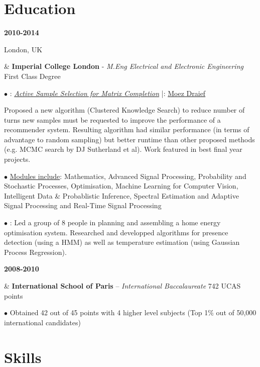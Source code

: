 \documentclass[a4paper,10pt,oneside]{article}
\begin{document}
\section*{Education}
\begin{body}

{\textbf{2010-2014} \par London, UK} & \textbf{Imperial College London} - \textit{M.Eng Electrical and Electronic Engineering} \hfill First Class Degree 



$\bullet$ \underline{}: \href{http://sg3510.github.io/al_proj/Report/thesis.pdf}{\textit{Active Sample Selection for Matrix Completion}} \hfill|\hfill  \underline{}: \href{http://www.iis.ee.ic.ac.uk/m.draief}{Moez Draief}

Proposed a new algorithm (Clustered Knowledge Search) to reduce number of turns new samples must be requested to improve the performance of a recommender system. Resulting algorithm had similar performance (in terms of advantage to random sampling) but better runtime than other proposed methods (e.g. MCMC search by DJ Sutherland et al). Work featured in best final year projects.

$\bullet$ \underline{Modules include}: Mathematics, Advanced Signal Processing, Probability and Stochastic Processes, Optimisation, Machine Learning for Computer Vision, Intelligent Data \& Probablistic Inference, Spectral Estimation and Adaptive Signal Processing and Real-Time Signal Processing



$\bullet$ \underline{}: Led a group of 8 people in planning and assembling a home energy optimisation system. Researched and developped algorithms for presence detection (using a HMM) as well as temperature estimation (using Gaussian Process Regression).
\\ 
{\textbf{2008-2010} \par {} } & \textbf{International School of Paris} – \textit{International Baccalaureate} \hfill 742 UCAS points

$\bullet$ Obtained 42 out of 45 points with 4 higher level subjects (Top 1\% out of 50,000 international candidates)

\end{body}

\section*{Skills}
\end{document}
